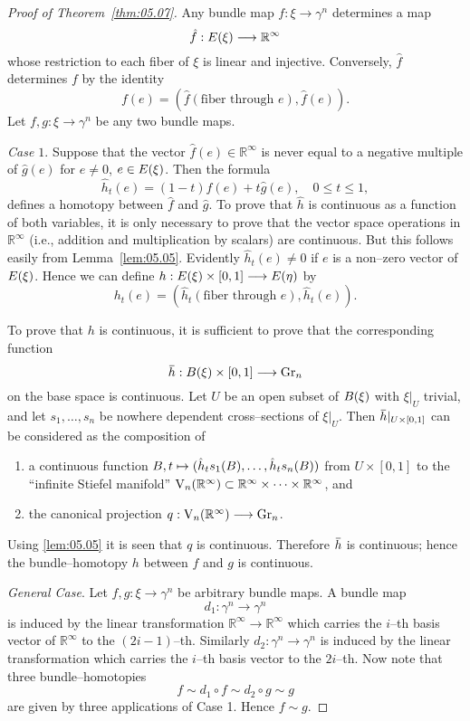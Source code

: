 \documentclass[../main]{subfiles}
\begin{document}
\begin{proof}[Proof of Theorem~\ref{thm:05.07}]
Any bundle map $f : \xi \longrightarrow \gamma^n$ determines a map \[\hat f : E(\xi) \longrightarrow {\mathbb R}^\infty\] whose restriction to each fiber of $\xi$ is linear and injective. Conversely, $\hat f$ determines $f$ by the identity \[f(e) = ({\hat f}(\text{fiber through } e), {\hat f}(e)).\] Let $f, g : \xi \longrightarrow \gamma^n$ be any two bundle maps. 

\emph{Case $1$}. Suppose that the vector ${\hat f}(e) \in {\mathbb R}^\infty$ is never equal to a negative multiple of ${\hat g}(e)$ for $e \ne 0$, $e \in E(\xi)$. Then the formula \[{\hat h}_t(e) = (1 - t) {\hat f}(e) + t {\hat g}(e), \quad 0 \le t \le 1,\] defines a homotopy between ${\hat f}$ and ${\hat g}$. To prove that $\hat h$ is continuous as a function of both variables, it is only necessary to prove that the vector space operations in ${\mathbb R}^\infty$ (i.e., addition and multiplication by scalars) are continuous. But this follows easily from Lemma~\ref{lem:05.05}. Evidently ${\hat h}_t(e) \ne 0$ if $e$ is a non--zero vector of $E(\xi)$. Hence we can define $h : E(\xi) \times [0, 1] \longrightarrow E(\eta)$ by \[h_t(e) = ({\hat h}_t(\text{fiber through } e), {\hat h}_t(e)).\] 

To prove that $h$ is continuous, it is sufficient to prove that the corresponding function \[\xoverline h : \base(\xi) \times [0, 1] \longrightarrow \grassmannian_n\] on the base space is continuous. Let $U$ be an open subset of $B(\xi)$ with $\xi |_U$ trivial, and let $s_1, \ldots, s_n$ be nowhere dependent cross--sections of $\xi |_U$. Then $\xoverline h |_{U \times [0,1]}$ can be considered as the composition of
\begin{enumerate}[label=\arabic*)]
    \item a continuous function $B, t \mapsto ({\hat h}_t s_1(B), \ldots, {\hat h}_t s_n(B))$ from $U \times [0, 1]$ to the ``infinite Stiefel manifold'' $\operatorname{V}_n({\mathbb R}^\infty) \subset {\mathbb R}^\infty \times \cdots \times {\mathbb R}^\infty$, and
    \item the canonical projection $q : \operatorname{V}_n({\mathbb R}^\infty) \longrightarrow \operatorname{Gr}_n$.
\end{enumerate} 
Using \ref{lem:05.05} it is seen that $q$ is continuous. Therefore $\xoverline h$ is continuous; hence the bundle--homotopy $h$ between $f$ and $g$ is continuous. 

\emph{General Case}. Let $f, g : \xi \longrightarrow \gamma^n$ be arbitrary bundle maps. A bundle map \[d_1 : \gamma^n \longrightarrow \gamma^n\] is induced by the linear transformation ${\mathbb R}^\infty \longrightarrow {\mathbb R}^\infty$ which carries the $i$--th basis vector of ${\mathbb R}^\infty$ to the $(2 i - 1)$--th. Similarly $d_2 : \gamma^n \longrightarrow \gamma^n$ is induced by the linear transformation which carries the $i$--th basis vector to the $2i$--th. Now note that three bundle--homotopies \[f \sim d_1 \circ f \sim d_2 \circ g \sim g\] are given by three applications of Case 1. Hence $f \sim g$.
\end{proof}
\end{document}
